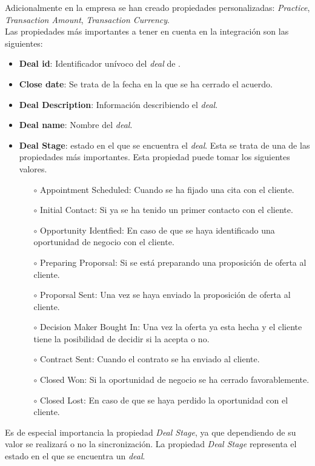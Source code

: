 		Adicionalmente en la empresa se han creado propiedades personalizadas: \textit{Practice}, \textit{Transaction Amount}, \textit{Transaction Currency}.\\
		
		Las propiedades más importantes a tener en cuenta en la integración son las siguientes:
		\begin{itemize}
			\item \textbf{Deal id}: Identificador unívoco del \textit{deal} de \hs.
			\item \textbf{Close date}: Se trata de la fecha en la que se ha cerrado el acuerdo.
			\item \textbf{Deal Description}: Información describiendo el \textit{deal}.
			\item \textbf{Deal name}: Nombre del \textit{deal}.
			\item \textbf{Deal Stage}: estado en el que se encuentra el \textit{deal}. Esta se trata de una de las propiedades más importantes. 
				Esta propiedad puede tomar los siguientes valores.
				\begin{itemize}
					\item[$\circ$] Appointment Scheduled: Cuando se ha fijado una cita con el cliente.
					\item[$\circ$] Initial Contact: Si ya se ha tenido un primer contacto con el cliente.
					\item[$\circ$] Opportunity Identfied: En caso de que se haya identificado una oportunidad de negocio con el cliente.
					\item[$\circ$] Preparing Proporsal: Si se está preparando una proposición de oferta al cliente.
					\item[$\circ$] Proporsal Sent: Una vez se haya enviado la proposición de oferta al cliente.
					\item[$\circ$] Decision Maker Bought In: Una vez la oferta ya esta hecha y el cliente tiene la posibilidad de decidir si la acepta o no.
					\item[$\circ$] Contract Sent: Cuando el contrato se ha enviado al cliente.
					\item[$\circ$] Closed Won: Si la oportunidad de negocio se ha cerrado favorablemente.
					\item[$\circ$] Closed Lost: En caso de que se haya perdido la oportunidad con el cliente.
				\end{itemize}
		\end{itemize}
		
		
		Es de especial importancia la propiedad \textit{Deal Stage}, ya que dependiendo de su valor se realizará o no la sincronización.
		La propiedad \textit{Deal Stage} representa el estado en el que se encuentra un \textit{deal}.
		

